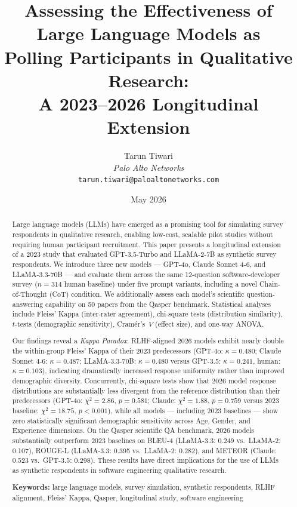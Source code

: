 \documentclass[11pt,a4paper]{article}
\title{%
  \Large\bfseries
  Assessing the Effectiveness of Large Language Models as\\
  Polling Participants in Qualitative Research:\\
  A 2023--2026 Longitudinal Extension%
}
\author{%
  Tarun Tiwari\\
  \textit{Palo Alto Networks}\\
  \texttt{tarun.tiwari@paloaltonetworks.com}
}
\date{May 2026}
\begin{document}
\maketitle
\thispagestyle{empty}

\begin{abstract}
Large language models (LLMs) have emerged as a promising tool for simulating
survey respondents in qualitative research, enabling low-cost, scalable pilot
studies without requiring human participant recruitment. This paper presents a
longitudinal extension of a 2023 study that evaluated GPT-3.5-Turbo and
LLaMA-2-7B as synthetic survey respondents. We introduce three new models ---
GPT-4o, Claude Sonnet 4-6, and LLaMA-3.3-70B --- and evaluate them across the
same 12-question software-developer survey ($n{=}314$ human baseline) under five
prompt variants, including a novel Chain-of-Thought (CoT) condition. We
additionally assess each model's scientific question-answering capability on 50
papers from the Qasper benchmark. Statistical analyses include Fleiss' Kappa
(inter-rater agreement), chi-square tests (distribution similarity), $t$-tests
(demographic sensitivity), Cram\'{e}r's~$V$ (effect size), and one-way ANOVA.

Our findings reveal a \textit{Kappa Paradox}: RLHF-aligned 2026 models exhibit
nearly double the within-group Fleiss' Kappa of their 2023 predecessors
(GPT-4o: $\kappa{=}0.480$; Claude Sonnet 4-6: $\kappa{=}0.487$;
LLaMA-3.3-70B: $\kappa{=}0.480$ versus GPT-3.5: $\kappa{=}0.241$, human:
$\kappa{=}0.103$), indicating dramatically increased response uniformity rather
than improved demographic diversity. Concurrently, chi-square tests show that
2026 model response distributions are substantially less divergent from the
reference distribution than their predecessors (GPT-4o: $\chi^2{=}2.86$,
$p{=}0.581$; Claude: $\chi^2{=}1.88$, $p{=}0.759$ versus 2023 baseline:
$\chi^2{=}18.75$, $p{<}0.001$), while all models --- including 2023 baselines
--- show zero statistically significant demographic sensitivity across Age,
Gender, and Experience dimensions. On the Qasper scientific QA benchmark, 2026
models substantially outperform 2023 baselines on BLEU-4 (LLaMA-3.3: 0.249
vs.\ LLaMA-2: 0.107), ROUGE-L (LLaMA-3.3: 0.395 vs.\ LLaMA-2: 0.282), and
METEOR (Claude: 0.523 vs.\ GPT-3.5: 0.298). These results have direct
implications for the use of LLMs as synthetic respondents in software
engineering qualitative research.

\bigskip
\noindent\textbf{Keywords:} large language models, survey simulation, synthetic
respondents, RLHF alignment, Fleiss' Kappa, Qasper, longitudinal study,
software engineering
\end{abstract}
\end{document}
